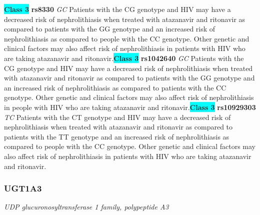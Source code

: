 \documentclass{report}
\begin{document}
\textbf{\colorbox{cyan} {Class 3}} \textbf{ rs8330 } \textit{ GC }
Patients with the CG genotype and HIV may have a decreased risk of nephrolithiasis when treated with atazanavir and ritonavir as compared to patients with the GG genotype and an increased risk of nephrolithiasis as compared to people with the CC genotype. Other genetic and clinical factors may also affect risk of nephrolithiasis in patients with HIV who are taking atazanavir and ritonavir.\newline\textbf{\colorbox{cyan} {Class 3}} \textbf{ rs1042640 } \textit{ GC }
Patients with the CG genotype and HIV may have a decreased risk of nephrolithiasis when treated with atazanavir and ritonavir as compared to patients with the GG genotype and an increased risk of nephrolithiasis as compared to patients with the CC genotype. Other genetic and clinical factors may also affect risk of nephrolithiasis in people with HIV who are taking atazanavir and ritonavir.\newline\textbf{\colorbox{cyan} {Class 3}} \textbf{ rs10929303 } \textit{ TC }
Patients with the CT genotype and HIV may have a decreased risk of nephrolithiasis when treated with atazanavir and ritonavir as compared to patients with the TT genotype and an increased risk of nephrolithiasis as compared to people with the CC genotype. Other genetic and clinical factors may also affect risk of nephrolithiasis in patients with HIV who are taking atazanavir and ritonavir. \newline\subsubsection{ UGT1A3 }
\textit{ UDP glucuronosyltransferase 1 family, polypeptide A3 }
\end{document}
